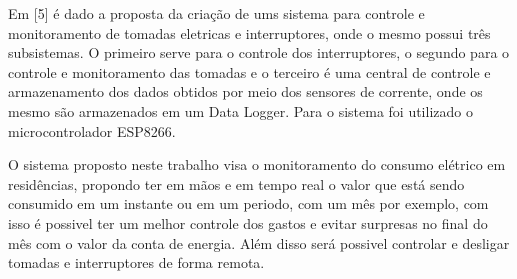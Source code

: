 Em [5] é dado a proposta da criação de ums sistema para controle e monitoramento de tomadas eletricas e interruptores, onde o mesmo possui três subsistemas. O primeiro serve para o controle dos interruptores, o segundo para o controle e monitoramento das tomadas e o terceiro é uma central de controle e armazenamento dos dados obtidos por meio dos sensores de corrente, onde os mesmo são armazenados em um Data Logger. Para o sistema foi utilizado o microcontrolador ESP8266.

O sistema proposto neste trabalho visa o monitoramento do consumo elétrico em residências, propondo ter em mãos e em tempo real o valor que está sendo consumido em um instante ou em um periodo, com um mês por exemplo, com isso é possivel ter um melhor controle dos gastos e evitar surpresas no final do mês com o valor da conta de energia. Além disso será possivel controlar e desligar tomadas e interruptores de forma remota.